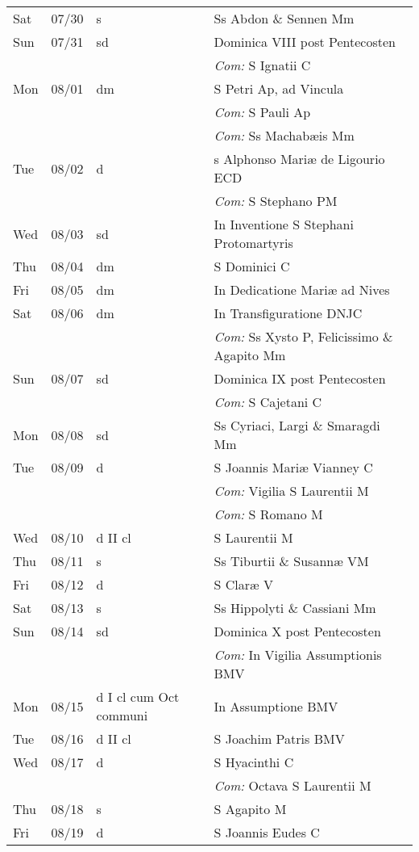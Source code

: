 \documentclass[10pt]{article}
\begin{document}
\begin{longtable}{ l l l l }
Sat & 07/30 & s & Ss Abdon \& Sennen Mm\\
Sun & 07/31 & sd & Dominica VIII post Pentecosten\\
 & & & \textit{Com:} S Ignatii C\\
Mon & 08/01 & dm & S Petri Ap, ad Vincula\\
 & & & \textit{Com:} S Pauli Ap\\
 & & & \textit{Com:} Ss Machabæis Mm\\
Tue & 08/02 & d & s Alphonso Mariæ de Ligourio ECD\\
 & & & \textit{Com:} S Stephano PM\\
Wed & 08/03 & sd & In Inventione S Stephani Protomartyris\\
Thu & 08/04 & dm & S Dominici C\\
Fri & 08/05 & dm & In Dedicatione Mariæ ad Nives\\
Sat & 08/06 & dm & In Transfiguratione DNJC\\
 & & & \textit{Com:} Ss Xysto P, Felicissimo \& Agapito Mm\\
Sun & 08/07 & sd & Dominica IX post Pentecosten\\
 & & & \textit{Com:} S Cajetani C\\
Mon & 08/08 & sd & Ss Cyriaci, Largi \& Smaragdi Mm\\
Tue & 08/09 & d & S Joannis Mariæ Vianney C\\
 & & & \textit{Com:} Vigilia S Laurentii M\\
 & & & \textit{Com:} S Romano M\\
Wed & 08/10 & d II cl & S Laurentii M\\
Thu & 08/11 & s & Ss Tiburtii \& Susannæ VM\\
Fri & 08/12 & d & S Claræ V\\
Sat & 08/13 & s & Ss Hippolyti \& Cassiani Mm\\
Sun & 08/14 & sd & Dominica X post Pentecosten\\
 & & & \textit{Com:} In Vigilia Assumptionis BMV\\
Mon & 08/15 & d I cl cum Oct communi & In Assumptione BMV\\
Tue & 08/16 & d II cl & S Joachim Patris BMV\\
Wed & 08/17 & d & S Hyacinthi C\\
 & & & \textit{Com:} Octava S Laurentii M\\
Thu & 08/18 & s & S Agapito M\\
Fri & 08/19 & d & S Joannis Eudes C\\

\end{longtable}
\end{document}
